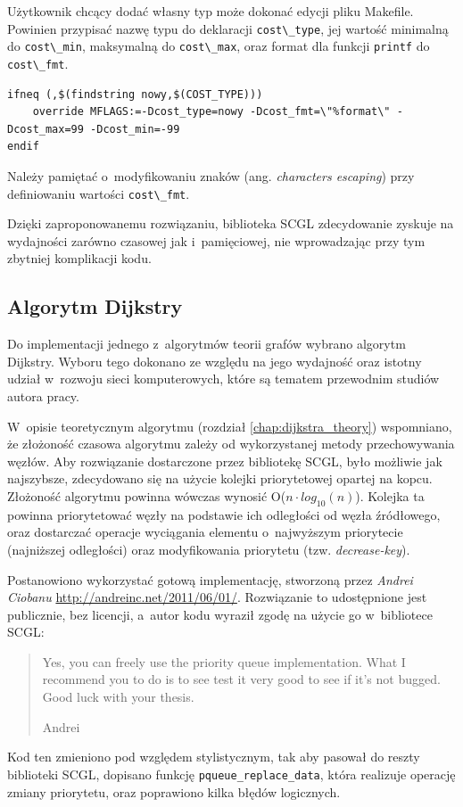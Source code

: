 \documentclass[a4paper,12pt,polish,twoside,openright]{thesis}
\newcommand\code[1]{\lstinline[style=line]{#1}}
\begin{document}
Użytkownik chcący dodać własny typ może dokonać edycji pliku Makefile.
Powinien przypisać nazwę typu do deklaracji \code{cost\_type}, jej wartość minimalną do \code{cost\_min}, maksymalną do \code{cost\_max}, oraz format dla funkcji \code{printf} do \code{cost\_fmt}.
\begin{lstlisting}[style=coden,caption=Przykład nowego typu kosztu krawędzi]
ifneq (,$(findstring nowy,$(COST_TYPE)))
	override MFLAGS:=-Dcost_type=nowy -Dcost_fmt=\"%format\" -Dcost_max=99 -Dcost_min=-99
endif
\end{lstlisting}
Należy pamiętać o~modyfikowaniu znaków (ang. \emph{characters escaping}) przy definiowaniu wartości \code{cost\_fmt}.

Dzięki zaproponowanemu rozwiązaniu, biblioteka SCGL zdecydowanie zyskuje na wydajności zarówno czasowej jak i~pamięciowej, nie wprowadzając przy tym zbytniej komplikacji kodu.

\subsection{Algorytm Dijkstry}
\label{chap:dijkstra}
Do implementacji jednego z~algorytmów teorii grafów wybrano algorytm Dijkstry.
Wyboru tego dokonano ze względu na jego wydajność oraz istotny udział w~rozwoju sieci komputerowych, które są tematem przewodnim studiów autora pracy.

W~opisie teoretycznym algorytmu (rozdział \ref{chap:dijkstra_theory}) wspomniano, że złożoność czasowa algorytmu zależy od wykorzystanej metody przechowywania węzłów.
Aby rozwiązanie dostarczone przez bibliotekę SCGL, było możliwie jak najszybsze, zdecydowano się na użycie kolejki priorytetowej opartej na kopcu.
Złożoność algorytmu powinna wówczas wynosić O($n \cdot log_{10}{(n)}$)\cite{art1}.
Kolejka ta powinna priorytetować węzły na podstawie ich odległości od węzła źródłowego, oraz dostarczać operacje wyciągania elementu o~najwyższym priorytecie (najniższej odległości) oraz modyfikowania priorytetu (tzw. \emph{decrease-key}).

Postanowiono wykorzystać gotową implementację, stworzoną przez \emph{Andrei Ciobanu} \url{http://andreinc.net/2011/06/01/}.
Rozwiązanie to udostępnione jest publicznie, bez licencji, a~autor kodu wyraził zgodę na użycie go w~bibliotece SCGL:
\begin{quote}
Yes, you can freely use the priority queue implementation.
What I recommend you to do is to see test it very good to see if it's not bugged.
Good luck with your thesis.

Andrei
\end{quote}
Kod ten zmieniono pod względem stylistycznym, tak aby pasował do reszty biblioteki SCGL, dopisano funkcję \code{pqueue_replace_data}, która realizuje operację zmiany priorytetu, oraz poprawiono kilka błędów logicznych.
\end{document}
